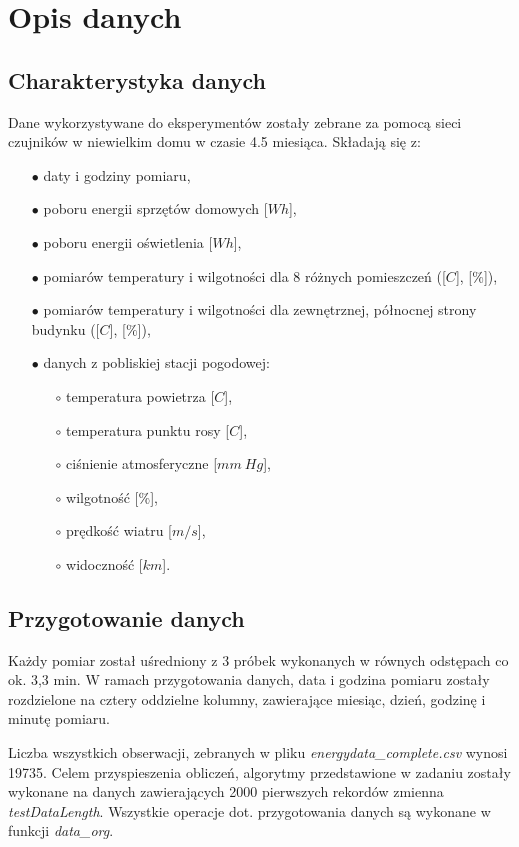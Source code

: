 \documentclass[a4paper,11pt,twoside]{mwrep}  %
\begin{document}
\endgroup

\begingroup
\let\clearpage\relax
\chapter{Opis danych}

\section{Charakterystyka danych}

Dane wykorzystywane do eksperymentów zostały zebrane za pomocą sieci czujników w niewielkim domu w czasie 4.5 miesiąca. 
Składają się z:
\begin{itemize}
\item[$\bullet$] daty i godziny pomiaru,
\item[$\bullet$] poboru energii sprzętów domowych [$Wh$],
\item[$\bullet$] poboru energii oświetlenia [$Wh$],
\item[$\bullet$] pomiarów temperatury i wilgotności dla 8 różnych pomieszczeń ([\degree $C$], [$\%$]),
\item[$\bullet$] pomiarów temperatury i wilgotności dla zewnętrznej, północnej strony budynku ([\degree $C$], [$\%$]),
\item[$\bullet$] danych z pobliskiej stacji pogodowej:
	\begin{itemize}
	\item[$\circ$] temperatura powietrza [\degree $C$],
	\item[$\circ$] temperatura punktu rosy [\degree $C$],
	\item[$\circ$] ciśnienie atmosferyczne [$mm~Hg$],
	\item[$\circ$] wilgotność [$\%$],
	\item[$\circ$] prędkość wiatru [$m/s$],
	\item[$\circ$] widoczność [$km$].
	\end{itemize}
\end{itemize}

\section{Przygotowanie danych}
Każdy pomiar został uśredniony z 3 próbek wykonanych w równych odstępach co ok. 3,3 min. W ramach przygotowania danych, data i godzina pomiaru zostały rozdzielone na cztery oddzielne kolumny, zawierające miesiąc, dzień, godzinę i minutę pomiaru.
\par
Liczba wszystkich obserwacji, zebranych w pliku \textit{energydata\_complete.csv} wynosi 19735. Celem przyspieszenia obliczeń, algorytmy przedstawione w zadaniu zostały wykonane na danych zawierających 2000 pierwszych rekordów zmienna \textit{testDataLength}. Wszystkie operacje dot. przygotowania danych są wykonane w funkcji \textit{data\_org}.
\endgroup
\end{document}
